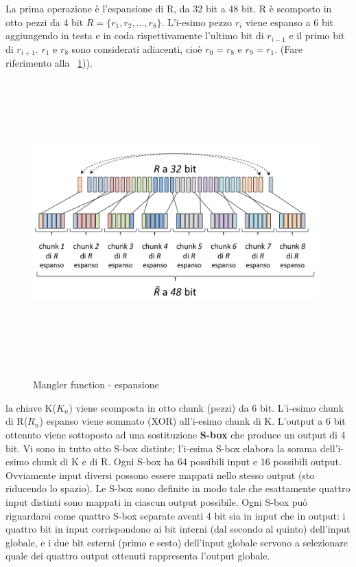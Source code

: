 La prima operazione è l’espansione di R, da 32 bit a 48 bit. R è scomposto in otto pezzi da 4 bit $R = \lbrace r_{1} , r_{2}, ..., r_{8} \rbrace$. L’i-esimo pezzo $r_{i}$ viene espanso a 6 bit aggiungendo in testa e in coda rispettivamente l’ultimo bit di $r_{i-1}$ e il primo bit di $r_{i+1}$. $r_{1}$ e $r_{8}$ sono considerati adiacenti, cioè $r_{0} = r_{8}$ e $r_{9} = r_{1}$. (Fare riferimento alla \figurename ~\ref{fig:mangler_exp})).
\begin{figure}[htbp]
	\centering%
	\subfigure%
	{\includegraphics[height=11cm, width=11cm, keepaspectratio]{Immagini/chiave_segreta/mangler_exp.png}}
	\caption{Mangler function - espansione \label{fig:mangler_exp}} 	
\end{figure}
\newline
la chiave K($K_{n}$) viene scomposta in otto chunk (pezzi) da 6 bit. L'i-esimo chunk di R($R_{n}$) espanso viene sommato (XOR) all’i-esimo chunk di K. L'output a 6 bit ottenuto viene sottoposto ad una sostituzione \textbf{S-box} che produce un output di 4 bit. Vi sono in tutto otto S-box distinte; l’i-esima S-box elabora la somma dell’i-esimo chunk di K e di R. Ogni S-box ha 64 possibili input e 16 possibili output. Ovviamente input diversi possono essere mappati nello stesso output (sto riducendo lo spazio). Le S-box sono definite in modo tale che esattamente quattro
input distinti sono mappati in ciascun output possibile. Ogni S-box può riguardarsi come quattro S-box separate aventi 4 bit sia in input che in output: i quattro bit in input corrispondono ai bit interni (dal secondo al quinto) dell'input globale, e i due bit esterni (primo e sesto) dell’input globale servono a selezionare quale dei quattro output ottenuti rappresenta l'output globale.
